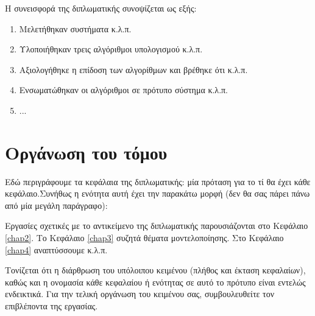 Η συνεισφορά της διπλωματικής συνοψίζεται ως εξής:
\begin{enumerate}
\item Μελετήθηκαν συστήματα κ.λ.π.
\item Υλοποιήθηκαν τρεις αλγόριθμοι υπολογισμού κ.λ.π.
\item Αξιολογήθηκε η επίδοση των αλγορίθμων και βρέθηκε ότι κ.λ.π.
\item Ενσωματώθηκαν οι αλγόριθμοι σε πρότυπο σύστημα κ.λ.π.
\item ...
\end{enumerate}


\section{Οργάνωση του τόμου}

Εδώ περιγράφουμε τα κεφάλαια της διπλωματικής: μία πρόταση για το τί θα έχει  κάθε κεφάλαιο.Συνήθως η ενότητα αυτή έχει την παρακάτω μορφή (δεν θα σας πάρει πάνω από μία μεγάλη παράγραφο):

Εργασίες σχετικές με το αντικείμενο της διπλωματικής παρουσιάζονται στο Κεφάλαιο \ref{chap2}. Το Κεφάλαιο \ref{chap3} συζητά θέματα μοντελοποίησης. Στο Κεφάλαιο \ref{chap4} αναπτύσσουμε κ.λ.π. 

Τονίζεται ότι η διάρθρωση του υπόλοιπου κειμένου (πλήθος και έκταση κεφαλαίων), καθώς και η ονομασία κάθε κεφαλαίου ή ενότητας σε αυτό το πρότυπο είναι εντελώς ενδεικτικά. Για την τελική οργάνωση του κειμένου σας, συμβουλευθείτε τον επιβλέποντα της εργασίας.

